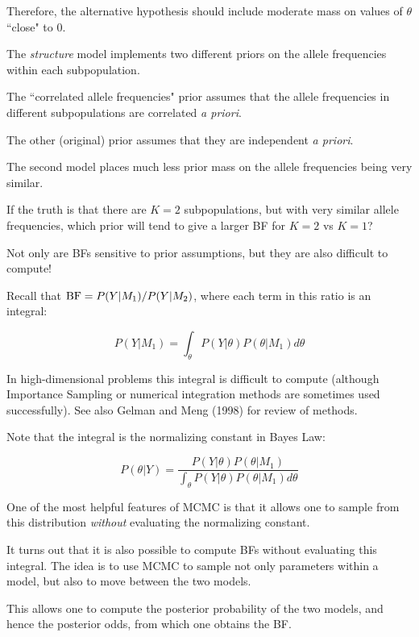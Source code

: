 Therefore, the alternative hypothesis should include moderate mass on values
of $\theta$ ``close" to 0.


The {\sl structure} model implements two different priors on
the allele frequencies within each subpopulation.

The ``correlated allele frequencies" prior assumes that the
allele frequencies in different subpopulations are correlated {\it a priori}.

The other (original) prior assumes that they are independent {\it a priori}.

The second model places much less prior mass on the allele frequencies being
very similar. 

If the truth is that there are $K=2$ subpopulations, but with very similar allele frequencies,
which prior will tend to give a larger BF for $K=2$ vs $K=1$?


Not only are BFs sensitive to prior assumptions, but they are also difficult to compute!

Recall that $\text{BF} = P(Y|M_1)/P(Y|M_2)$, where each term in this ratio is an integral:

$$P(Y | M_1) = \int_\theta P(Y|\theta)P(\theta|M_1)d\theta$$

In high-dimensional problems this integral is difficult to compute (although
Importance Sampling or numerical integration methods are sometimes used
successfully). See also Gelman and Meng (1998) for review of methods.



Note that the integral is the normalizing constant in Bayes Law:

$$P(\theta|Y) = \frac{P(Y|\theta)P(\theta|M_1)}
	{\int_\theta P(Y|\theta)P(\theta|M_1)d\theta}$$

One of the most helpful features of MCMC is that it allows
one to sample from this distribution {\it without} evaluating the normalizing
constant.

It turns out that it is also possible to compute BFs without evaluating
this integral. The idea is to use MCMC to sample not only parameters within
a model, but also to move between the two models.

This allows one to compute the posterior probability of the two models,
and hence the posterior odds, from which one obtains the BF.

